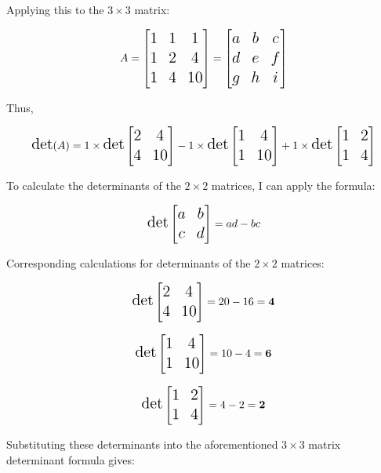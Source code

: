 \documentclass[
]{article}
\begin{document}
Applying this to the \(3 \times 3\) matrix:

\[
\Large
A = \begin{bmatrix}
1 & 1 & 1 \\
1 & 2 & 4 \\
1 & 4 & 10 
\end{bmatrix}
=
\begin{bmatrix}
a & b & c \\
d & e & f \\
g & h & i 
\end{bmatrix}
\]

Thus,

\[
\Large
\text{det}(A) =
1 \times \text{det} \begin{bmatrix} 2 & 4 \\ 4 & 10 \end{bmatrix} - 1 \times \text{det} \begin{bmatrix} 1 & 4 \\ 1 & 10 \end{bmatrix} + 1 \times \text{det} \begin{bmatrix} 1 & 2 \\ 1 & 4 \end{bmatrix}
\]

To calculate the determinants of the \(2 \times 2\) matrices, I can
apply the formula:

\[
\Large
\text{det}\begin{bmatrix} a & b \\ c & d \end{bmatrix} = ad - bc
\]

Corresponding calculations for determinants of the \(2 \times 2\)
matrices:

\[
\Large
\text{det} 
 \begin{bmatrix} 2 & 4 \\ 4 & 10 \end{bmatrix} = 20 - 16 =\mathbf{4}
\]

\[
\Large
 \text{det} \begin{bmatrix} 1 & 4 \\ 1 & 10 \end{bmatrix} = 10 - 4 =\mathbf{6}
\]

\[
\Large
 \text{det} \begin{bmatrix} 1 & 2 \\ 1 & 4 \end{bmatrix} = 4-2 = \mathbf{2}
\]

Substituting these determinants into the aforementioned \(3 \times 3\)
matrix determinant formula gives:
\end{document}
